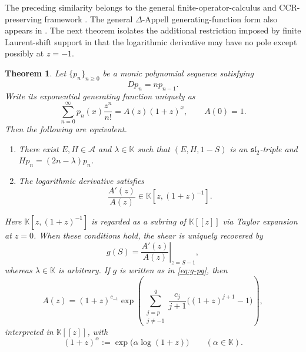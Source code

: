 \documentclass[11pt,reqno]{amsart}
\numberwithin{equation}{section}
\newtheorem{theorem}{Theorem}[section]
\theoremstyle{definition}
\theoremstyle{remark}
\newcommand{\K}{\mathbb K}
\newcommand{\algA}{\mathcal A}
\begin{document}
The preceding similarity belongs to the general finite-operator-calculus and CCR-preserving framework \cite{ChryssomalakosTurbiner2001,Roman1984,RotaKahanerOdlyzko1973}.  The general $\Delta$-Appell generating-function form also appears in \cite[Theorem~2.1]{BenCheikhZaghouani2003}.  The next theorem isolates the additional restriction imposed by finite Laurent-shift support in that the logarithmic derivative may have no pole except possibly at $z=-1$.

\begin{theorem}\label{thm:recognize-sequence}
Let $\{p_n\}_{n\ge0}$ be a monic polynomial sequence satisfying
\[
 Dp_n=np_{n-1}.
\]
Write its exponential generating function uniquely as
\begin{equation}\label{eq:general-delta-appell}
 \sum_{n=0}^{\infty}p_n(x)\frac{z^n}{n!}
 =A(z)(1+z)^x,
 \qquad A(0)=1.
\end{equation}
Then the following are equivalent.
\begin{enumerate}[label=\textup{(\roman*)},leftmargin=2.3em]
\item There exist $E,H\in\algA$ and $\lambda\in\K$ such that $(E,H,1-S)$ is an $\mathfrak{sl}_2$-triple and $Hp_n=(2n-\lambda)p_n$.
\item The logarithmic derivative satisfies
\[
 \frac{A'(z)}{A(z)}\in\K[z,(1+z)^{-1}].
\]
\end{enumerate}
Here $\K[z,(1+z)^{-1}]$ is regarded as a subring of $\K[[z]]$
via Taylor expansion at $z=0$. When these conditions hold, the shear is uniquely recovered by
\begin{equation}\label{eq:g-from-A}
 g(S)=\left.\frac{A'(z)}{A(z)}\right|_{z=S-1},
\end{equation}
whereas $\lambda\in\K$ is arbitrary.  If $g$ is written as in \eqref{eq:g-pq}, then
\begin{equation}\label{eq:A-explicit}
 A(z)=(1+z)^{c_{-1}}
 \exp\!\left(
 \sum_{\substack{j=p\\j\ne-1}}^{q}
 \frac{c_j}{j+1}\bigl((1+z)^{j+1}-1\bigr)
 \right),
\end{equation}
interpreted in $\K[[z]]$, with
\[
 (1+z)^\alpha:=\exp\!\bigl(\alpha\log(1+z)\bigr)
 \qquad(\alpha\in\K).
\]
\end{theorem}
\end{document}
